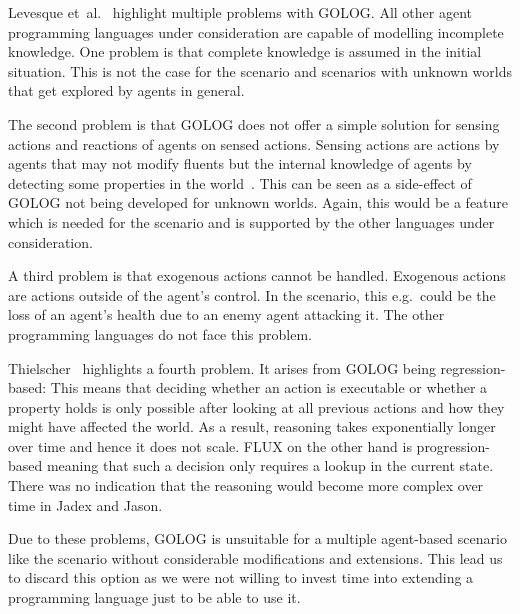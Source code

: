 Levesque et~al.~\cite{levesque_golog:_1997} highlight multiple problems with GOLOG.
All other agent programming languages under consideration are capable of modelling incomplete knowledge.
One problem is that complete knowledge is assumed in the initial situation.
This is not the case for the \mars scenario and scenarios with unknown worlds that get explored by agents in general.

The second problem is that GOLOG does not offer a simple solution for sensing actions and reactions of agents on sensed actions.
Sensing actions are actions by agents that may not modify fluents but the internal knowledge of agents by detecting some properties in the world~\cite{thielscher_flux:_2005}.
This can be seen as a side-effect of GOLOG not being developed for unknown worlds.
Again, this would be a feature which is needed for the \mars scenario and is supported by the other languages under consideration.

A third problem is that exogenous actions cannot be handled.
Exogenous actions are actions outside of the agent's control.
In the \mars scenario, this e.g.\ could be the loss of an agent's health due to an enemy agent attacking it.
The other programming languages do not face this problem.

Thielscher~\cite{thielscher_flux:_2005} highlights a fourth problem.
It arises from GOLOG being regression-based:
This means that deciding whether an action is executable or whether a property holds is only possible after looking at all previous actions and how they might have affected the world.
As a result, reasoning takes exponentially longer over time and hence it does not scale.
FLUX on the other hand is progression-based meaning that such a decision only requires a lookup in the current state.
There was no indication that the reasoning would become more complex over time in Jadex and Jason.

Due to these problems, GOLOG is unsuitable for a multiple agent-based scenario like the \mars scenario without considerable modifications and extensions.
This lead us to discard this option as we were not willing to invest time into extending a programming language just to be able to use it.

